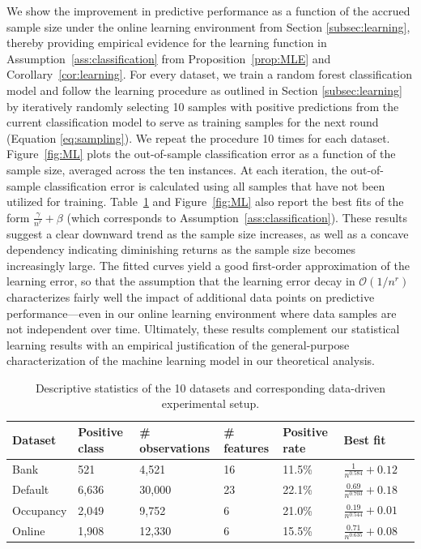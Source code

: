 \documentclass[nonblindrev]{informs3noheader}
\def\calO{\mathcal{O}}
\begin{document}
We show the improvement in predictive performance as a function of the accrued sample size under the online learning environment from Section \ref{subsec:learning}, thereby providing empirical evidence for the learning function in Assumption~\ref{ass:classification} from Proposition~\ref{prop:MLE} and Corollary~\ref{cor:learning}. For every dataset, we train a random forest classification model and follow the learning procedure as outlined in Section \ref{subsec:learning} by iteratively randomly selecting 10 samples with positive predictions from the current classification model to serve as training samples for the next round (Equation \ref{eq:sampling}). We repeat the procedure 10 times for each dataset. Figure~\ref{fig:ML} plots the out-of-sample classification error as a function of the sample size, averaged across the ten instances. At each iteration, the out-of-sample classification error is calculated using all samples that have not been utilized for training. Table~\ref{tab:dataset} and Figure~\ref{fig:ML} also report the best fits of the form $\frac{\gamma}{n^r}+\beta$ (which corresponds to Assumption~\ref{ass:classification}). These results suggest a clear downward trend as the sample size increases, as well as a concave dependency indicating diminishing returns as the sample size becomes increasingly large. The fitted curves yield a good first-order approximation of the learning error, so that the assumption that the learning error decay in $\calO(1/n^r)$ characterizes fairly well the impact of additional data points on predictive performance---even in our online learning environment where data samples are not independent over time. Ultimately, these results complement our statistical learning results with an empirical justification of the general-purpose characterization of the machine learning model in our theoretical analysis.

\begin{table}[h!]
\centering \small
\caption{Descriptive statistics of the 10 datasets and corresponding data-driven experimental setup.}
\label{tab:dataset}
\renewcommand{\arraystretch}{1.3}
\begin{tabular}{lllllll}
\toprule[1pt]
Dataset & Positive class & \# observations & \# features & Positive rate & Best fit\\ \midrule[0.5pt]
Bank & 521 & 4,521 & 16 & 11.5\% & $\frac{1}{n^{0.584}}+0.12$ \\
Default & 6,636 & 30,000 & 23 & 22.1\% & $\frac{0.69}{n^{0.703}}+0.18$ \\
Occupancy & 2,049 & 9,752 & 6 & 21.0\% & $\frac{0.19}{n^{0.544}}+0.01$\\
Online & 1,908 & 12,330 & 6 & 15.5\% & $\frac{0.71}{n^{0.635}}+0.08$ \\
\bottomrule[1pt] 
\end{tabular}
\end{table}
\end{document}
